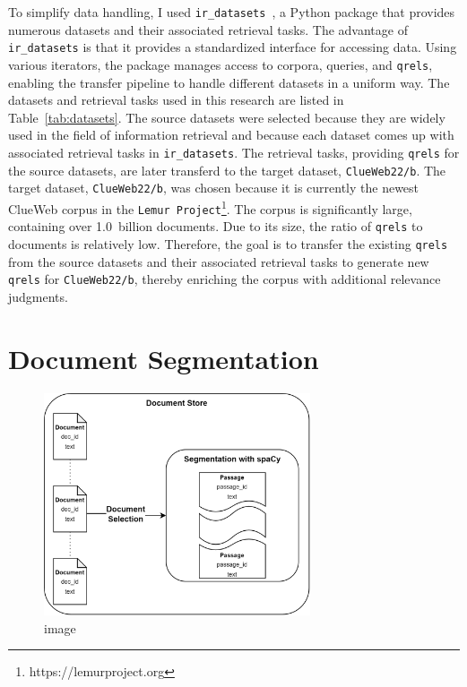 To simplify data handling, I used \texttt{ir\_datasets}~\citep{macavaney:2021}, a Python package that provides numerous datasets and their associated retrieval tasks. The advantage of \texttt{ir\_datasets} is that it provides a standardized interface for accessing data. Using various iterators, the package manages access to corpora, queries, and \texttt{qrels}, enabling the transfer pipeline to handle different datasets in a uniform way. The datasets and retrieval tasks used in this research are listed in Table~\ref{tab:datasets}. The source datasets were selected because they are widely used in the field of information retrieval and because each dataset comes up with associated retrieval tasks in \texttt{ir\_datasets}. The retrieval tasks, providing \texttt{qrels} for the source datasets, are later transferd to the target dataset, \texttt{ClueWeb22/b}. The target dataset, \texttt{ClueWeb22/b}, was chosen because it is currently the newest ClueWeb corpus in the \texttt{Lemur Project}\footnote{https://lemurproject.org}. The corpus is significantly large, containing over 1.0~billion documents. Due to its size, the ratio of \texttt{qrels} to documents is relatively low. Therefore, the goal is to transfer the existing \texttt{qrels} from the source datasets and their associated retrieval tasks to generate new \texttt{qrels} for \texttt{ClueWeb22/b}, thereby enriching the corpus with additional relevance judgments. 


\section{Document Segmentation}\label{document-segmentation}

\begin{figure}[ht]
    \centering
    \includegraphics[width=0.7\textwidth]{./graphics/drawio/document_segmentation.png}
    \caption{image}
  \end{figure}

